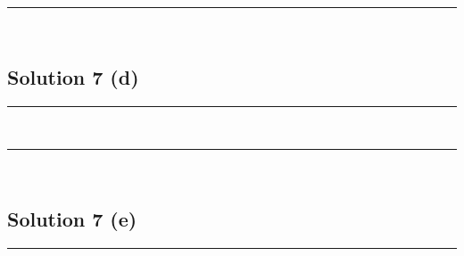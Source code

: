 \documentclass{article}
\begin{document}
\noindent\rule{\textwidth}{0.4pt}\\

\newpage

\subsection*{Solution 7 (d)}
\noindent\rule{\textwidth}{0.4pt}\\
\begin{comment}
  \begin{center}
    \begin{figure}
      \texttt{[image: /path/to/plot\_tree\_adaboost.png]}
      \caption{plot from sklearn.tree.plot_tree using adaboost}
    \end{figure}
  \end{center}
\end{comment}

\noindent\rule{\textwidth}{0.4pt}\\

\newpage

\subsection*{Solution 7 (e)}
\noindent\rule{\textwidth}{0.4pt}\\

\begin{comment}
  \begin{center} 
  \begin{tabular}{|c|c|c|} 
    \hline Stump Number (\%) & Training Accuracy (\%) \\ 
    \hline 
    1 & 16.32\\ 
    2 & 15.91 \\
    3 & 14.25 \\
    4 & 13.56 \\ 
    5 & 14.05  \\ 
    \hline
  \end{tabular}
\end{center}
\end{comment}
\end{document}
